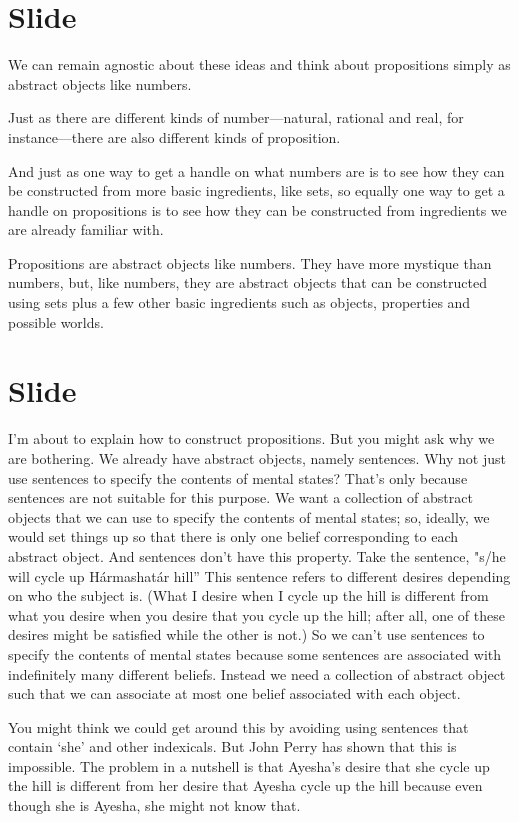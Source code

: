 \documentclass[12pt,\papersize]{extarticle}
\begin{document}
\section{Slide}
We can remain agnostic about these ideas and think about propositions simply as abstract objects like numbers.

Just as there are different kinds of number---natural, rational and real, for instance---there are also different kinds of proposition.

And just as one way to get a handle on what numbers are is to see how they can be constructed from more basic ingredients, like sets, so equally one way to get a handle on propositions is to see how they can be constructed from ingredients we are already familiar with.

Propositions are abstract objects like numbers.
They have more mystique than numbers, but, like numbers, they are abstract objects that can be constructed using sets plus a few other basic ingredients such as objects, properties and possible worlds.


\section{Slide}
I’m about to explain how to construct propositions.
But you might ask why we are bothering.
We already have abstract objects, namely sentences.
Why not just use sentences to specify the contents of mental states?
That’s only because sentences are not suitable for this purpose.
We want a collection of abstract objects that we can use to specify the contents of mental states; so, ideally, we would set things up so that there is only one belief corresponding to each abstract object.
And sentences don’t have this property.
Take the sentence, "s/he will cycle up Hármashatár hill”
This sentence refers to different desires depending on who the subject is.
(What I desire when I cycle up the hill is different from what you desire when you desire that you cycle up the hill; after all, one of these desires might be satisfied while the other is not.)
So we can’t use sentences to specify the contents of mental states because some sentences are associated with indefinitely many different beliefs.
Instead we need a collection of abstract object such that we can associate at most one belief associated with each object.

You might think we could get around this by avoiding using sentences that contain ‘she’ and other indexicals.
But John Perry has shown that this is impossible.
The problem in a nutshell is that Ayesha’s desire that she cycle up the hill is different from her desire that Ayesha cycle up the hill because even though she is Ayesha, she might not know that.
\end{document}
